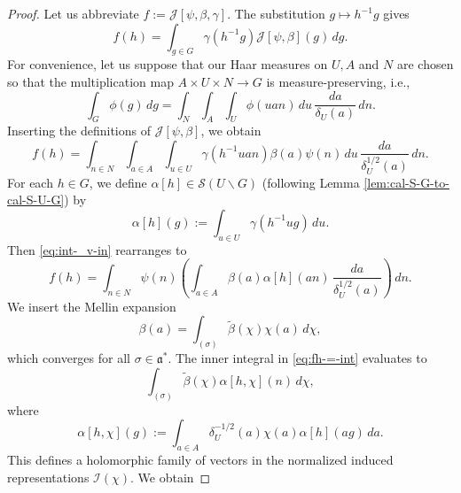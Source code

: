 \documentclass[reqno]{amsart}
\theoremstyle{plain} \newtheorem{theorem} {Theorem}
\theoremstyle{definition} \newtheorem{definition} [theorem] {Definition}
\theoremstyle{itplain} %
\numberwithin{equation}{section}
\numberwithin{theorem}{section}
\begin{document}
\begin{proof}
  Let us abbreviate $f := \mathcal{J}[\psi,\beta,\gamma]$.  The substitution $g \mapsto h^{-1} g$ gives
  \begin{equation*}
    f(h) = \int _{g \in G} \gamma(h^{-1} g) \mathcal{J}[\psi,\beta](g) \, d g.
  \end{equation*}
  For convenience, let us suppose that our Haar measures on $U, A$ and $N$ are chosen so that the multiplication map $A \times U \times N \rightarrow G$ is measure-preserving,
  i.e.,
  \begin{equation*}
    \int _{G} \phi (g) \,d g
    =
    \int _N \int _A \int _U \phi (u a n ) \, d u \, \frac{d a}{ \delta_U(a)} \, d n.
  \end{equation*}
  Inserting the definitions of $\mathcal{J}[\psi,\beta]$, we obtain 
  \begin{equation}\label{eq:int-_v-in}
    f(h) =
    \int _{n \in N}
    \int _{a \in A}
    \int _{u \in U}
    \gamma(h^{-1} u a n)
    \beta(a) \psi(n)
    \, d u \, \frac{d a}{\delta_U^{1/2}(a)} \, d n.
  \end{equation}
  For each $h \in G$, we define $\alpha[h] \in \mathcal{S}(U \backslash G)$ (following Lemma \ref{lem:cal-S-G-to-cal-S-U-G}) by
  \begin{equation*}
    \alpha[h](g) := \int _{u \in U} \gamma(h^{-1} u g) \, d u.
  \end{equation*}
  Then \eqref{eq:int-_v-in} rearranges to
  \begin{equation}\label{eq:fh-=-int}
    f(h) =
    \int _{n \in N} \psi(n)
    \left(
      \int _{a \in A}
      \beta(a)
      \alpha[h](a n)
    \, \frac{d a}{\delta_U^{1/2}(a)}
    \right)
    \, d n.
  \end{equation}
  We insert the Mellin expansion
  \begin{equation*}
    \beta(a) =
    \int _{(\sigma)}
    \tilde{\beta}(\chi)
    \chi(a) \, d \chi,
  \end{equation*}
  which converges for all $\sigma \in \mathfrak{a}^*$.  The inner integral in \eqref{eq:fh-=-int} evaluates to
  \begin{equation*}
    \int _{(\sigma)}
    \tilde{\beta}(\chi) \alpha[h,\chi](n) \, d \chi,
  \end{equation*}
  where
  \begin{equation*}
    \alpha[h,\chi](g) :=
    \int _{a \in A}
    \delta_U^{-1/2}(a)
    \chi(a) \alpha[h](a g) \, d a.
  \end{equation*}
  This defines a holomorphic family of vectors in the normalized induced representations $\mathcal{I}(\chi)$.  We obtain

\end{proof}
\end{document}
